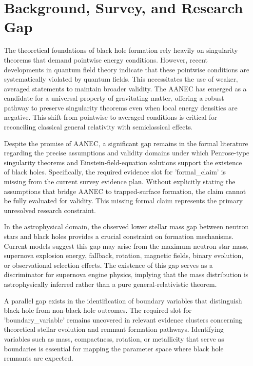 \documentclass[conference]{IEEEtran}
\begin{document}
\section{Background, Survey, and Research Gap}
The theoretical foundations of black hole formation rely heavily on singularity theorems that demand pointwise energy conditions. However, recent developments in quantum field theory indicate that these pointwise conditions are systematically violated by quantum fields. This necessitates the use of weaker, averaged statements to maintain broader validity. The AANEC has emerged as a candidate for a universal property of gravitating matter, offering a robust pathway to preserve singularity theorems even when local energy densities are negative. This shift from pointwise to averaged conditions is critical for reconciling classical general relativity with semiclassical effects.~\cite{cite_0ed84243cf171bc4}

Despite the promise of AANEC, a significant gap remains in the formal literature regarding the precise assumptions and validity domains under which Penrose-type singularity theorems and Einstein-field-equation solutions support the existence of black holes. Specifically, the required evidence slot for 'formal\_claim' is missing from the current survey evidence plan. Without explicitly stating the assumptions that bridge AANEC to trapped-surface formation, the claim cannot be fully evaluated for validity. This missing formal claim represents the primary unresolved research constraint.

In the astrophysical domain, the observed lower stellar mass gap between neutron stars and black holes provides a crucial constraint on formation mechanisms. Current models suggest this gap may arise from the maximum neutron-star mass, supernova explosion energy, fallback, rotation, magnetic fields, binary evolution, or observational selection effects. The existence of this gap serves as a discriminator for supernova engine physics, implying that the mass distribution is astrophysically inferred rather than a pure general-relativistic theorem.

A parallel gap exists in the identification of boundary variables that distinguish black-hole from non-black-hole outcomes. The required slot for 'boundary\_variable' remains uncovered in relevant evidence clusters concerning theoretical stellar evolution and remnant formation pathways. Identifying variables such as mass, compactness, rotation, or metallicity that serve as boundaries is essential for mapping the parameter space where black hole remnants are expected.
\end{document}
